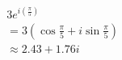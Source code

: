 \documentclass[preview]{standalone}
\begin{document}
\begin{align*}
& 3 e^{i \left(\frac{\pi}{5}\right)} \\ &=  3 (\cos\frac{\pi}{5} + i\sin\frac{\pi}{5}) \\ &\approx  2.43  +  1.76 i
\end{align*}
\end{document}
